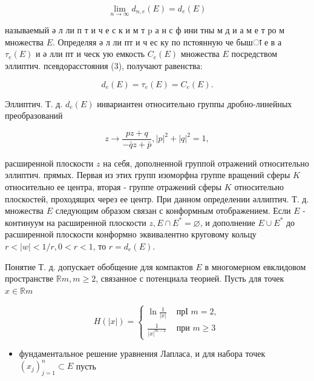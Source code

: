 \documentclass[10pt]{article}
\begin{document}
\[

\lim _{n \rightarrow \infty} d_{n, e}(E)=d_{e}(E)

\]



называемый ә л ли п т и ч е с к и м т $\mathrm{p}$ а н с ф ини тны м д и а м е т ро м множества $E$. Определяя ә л ли пт и ч ес ку по пстоянную че бышा е в а $\tau_{e}(E)$ и ә лли пт и ческ ую емкость $C_{e}(E)$ множества $E$ посредством эллиптич. псевдорасстояния (3), получают равенства:



\[

d_{e}(E)=\tau_{e}(E)=C_{e}(E) .

\]



Эллиптич. Т. д. $d_{e}(E)$ инвариантен относительно группы дробно-линейных преобразований



\[

z \rightarrow \frac{p z+q}{-\bar{q} z+\bar{p}},|p|^{2}+|q|^{2}=1,

\]



расширенной плоскости $z$ на себя, дополненной группой отражений относительно эллиптич. прямых. Первая из этих групп изоморфна группе вращений сферы $K$ относительно ее центра, вторая - группе отражений сферы $K$ относительно плоскостей, проходящих через ее центр. При данном определении әллиптич. Т. д. множества $E$ следующим образом связан с конформным отображением. Если $E$ - континуум на расширенной плоскости $z, E \cap E^{*}=\varnothing$, и дополнение $E \cup E^{*}$ до расширенной плоскости конформно эквивалентно круговому кольцу $r<|w|<1 / r, 0<r<1$, то $r=d_{e}(E)$.



Понятие Т. д. допускает обобщение для компактов $E$ в многомерном евклидовом пространстве $\mathbb{R} m, m \geqslant 2$, связанное с потенциала теорией. Пусть для точек $x \in \mathbb{R} m$



\[

H(|x|)= \begin{cases}\ln \frac{1}{|x|} & \text { прІ } m=2, \\ \frac{1}{|x|^{m-2}} & \text { при } m \geqslant 3\end{cases}

\]



\begin{itemize}

  \item фундаментальное решение уравнения Лапласа, и для набора точек $\left(x_{j}\right)_{j=1}^{n} \subset E$ пусть

\end{itemize}
\end{document}
